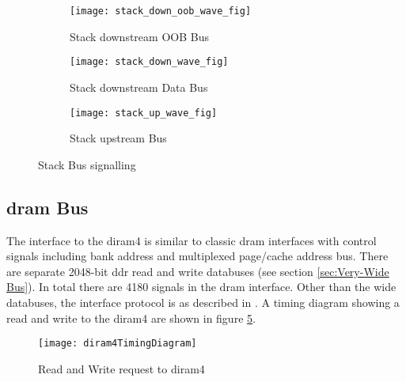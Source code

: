 \begin{figure}
\centering
\begin{subfigure}{.9\textwidth}
  \centering
  \texttt{[image: stack\_down\_oob\_wave\_fig]}
  \captionsetup{justification=centering, skip=10pt}
  \caption{Stack downstream OOB Bus}
  \label{fig:Stack downstream OOB Bus}
\end{subfigure}%

\bigskip

\begin{subfigure}{.9\textwidth}
  \centering
  \texttt{[image: stack\_down\_wave\_fig]}
  \captionsetup{justification=centering, skip=10pt}
  \caption{Stack downstream Data Bus}
  \label{fig:Stack downstream Data Bus}
\end{subfigure}%

\bigskip

\begin{subfigure}{.9\textwidth}
  \centering
  \texttt{[image: stack\_up\_wave\_fig]}
  \captionsetup{justification=centering, skip=10pt}
  \caption{Stack upstream Bus}
  \label{fig:Stack upstream Bus}
\end{subfigure}%

\captionsetup{justification=centering, skip=16pt}
\caption{Stack Bus signalling}
\label{fig:Stack Bus signalling}
\end{figure}


\subsection{\ac{dram} Bus}
\label{sec:DRAM Bus}

The interface to the \ac{diram4} is similar to classic \ac{dram} interfaces with control signals including bank address and multiplexed page/cache address bus.
There are separate 2048-bit \ac{ddr} read and write databuses (see section \ref{sec:Very-Wide Bus}).
In total there are 4180 signals in the \ac{dram} interface.
Other than the wide databuses, the interface protocol is as described in \cite{tezzaron:diram4}.
A timing diagram showing a read and write to the \ac{diram4} are shown in figure \ref{fig:diram4Timing}.
\begin{figure}[!t]
\centering
\captionsetup{justification=centering}
\captionsetup{width=.9\linewidth}
\centerline{
\mbox{\texttt{[image: diram4TimingDiagram]}}
}
\caption{Read and Write request to \ac{diram4} \cite{tezzaron:diram4}}
\label{fig:diram4Timing}
\end{figure}



